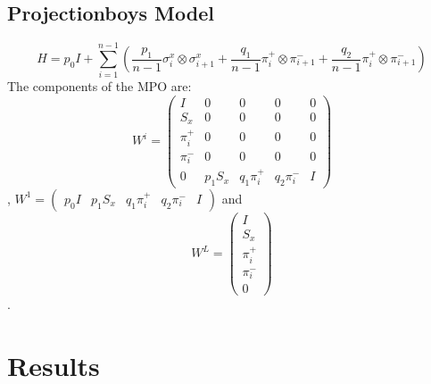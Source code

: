 \documentclass[english]{article}
\begin{document}
\subsection{Projectionboys Model}
\begin{displaymath}
H = p_0 I +  \sum_{i=1}^{n-1}(\frac{p_1}{n-1}\sigma_i^x\otimes\sigma_{i+1}^x + \frac{q_1}{n-1}\pi_i^+\otimes\pi_{i+1}^- + \frac{q_2}{n-1}\pi_i^+\otimes\pi_{i+1}^-)
\end{displaymath}
The components of the MPO are:
$$W^{i}=
\begin{pmatrix}
I & 0 & 0 & 0 & 0 \\
S_x & 0 & 0  & 0 & 0 \\
\pi_i^+ & 0 & 0  & 0 & 0 \\
\pi_i^- & 0 & 0  & 0 & 0 \\
0 & p_1 S_x & q_1 \pi_i^+  & q_2 \pi_i^- & I
\end{pmatrix}$$,
$W^1=\begin{pmatrix}p_0 I & p_1 S_x & q_1 \pi_i^+ & q_2 \pi_i^- & I\end{pmatrix}$ and
$$W^L=
\begin{pmatrix}
I \\ S_x \\ \pi_i^+ \\ \pi_i^- \\ 0
\end{pmatrix}$$.

\section{Results}
\end{document}
